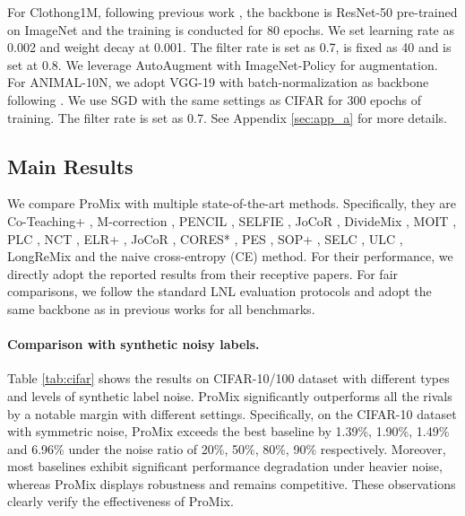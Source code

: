 \documentclass{article}
\begin{document}
For Clothong1M, following previous work \cite{DBLP:conf/iclr/LiSH20}, the backbone is ResNet-50 pre-trained on ImageNet and the training is conducted for 80 epochs. We set learning rate as 0.002 and weight decay at 0.001. The filter rate  is set as 0.7,  is fixed as 40 and  is set at 0.8. We leverage AutoAugment \cite{DBLP:conf/cvpr/CubukZMVL19} with ImageNet-Policy for augmentation. For ANIMAL-10N, we adopt VGG-19 \cite{DBLP:journals/corr/SimonyanZ14a} with batch-normalization as backbone following \cite{DBLP:conf/icml/SongK019}. We use SGD with the same settings as CIFAR for 300 epochs of training. The filter rate  is set as 0.7. {See Appendix \ref{sec:app_a} for more details.}







\subsection{Main Results}
We compare ProMix with multiple state-of-the-art methods. Specifically, they are Co-Teaching+ \cite{DBLP:conf/icml/Yu0YNTS19}, M-correction \cite{DBLP:conf/icml/ArazoOAOM19}, PENCIL \cite{DBLP:conf/cvpr/YiW19}, SELFIE \cite{DBLP:conf/icml/SongK019}, JoCoR \cite{DBLP:conf/cvpr/WeiFC020}, DivideMix \cite{DBLP:conf/iclr/LiSH20}, MOIT \cite{DBLP:conf/cvpr/OrtegoAAOM21}, PLC \cite{DBLP:conf/iclr/ZhangZW0021}, NCT \cite{DBLP:conf/cvpr/ChenSHS21}, ELR+ \cite{DBLP:conf/nips/LiuNRF20}, JoCoR \cite{DBLP:conf/cvpr/WeiFC020}, CORES* \cite{DBLP:conf/iclr/ChengZLGSL21}, PES \cite{DBLP:conf/nips/BaiYHYLMNL21}, SOP+ \cite{DBLP:journals/corr/abs-2202-14026}, SELC \cite{DBLP:conf/ijcai/LuH22}, ULC \cite{DBLP:conf/aaai/HuangBZBW22}, LongReMix \cite{DBLP:journals/pr/CordeiroSBRC23} and the naive cross-entropy (CE) method. For their performance, we directly adopt the reported results from their receptive papers. For fair comparisons, we follow the standard LNL evaluation protocols \cite{DBLP:conf/iclr/LiSH20,DBLP:conf/nips/XiaLW00NS19} and adopt the same backbone as in previous works for all benchmarks. 
\paragraph{Comparison with synthetic noisy labels. } 
 Table \ref{tab:cifar} shows the results on CIFAR-10/100 dataset with different types and levels of synthetic label noise. ProMix significantly outperforms all the rivals by a notable margin with different settings. Specifically, on the CIFAR-10 dataset with symmetric noise, ProMix exceeds the best baseline by 1.39\%, 1.90\%, 1.49\% and 6.96\% under the noise ratio of 20\%, 50\%, 80\%, 90\% respectively. Moreover, most baselines exhibit significant performance degradation under heavier noise, whereas ProMix displays robustness and remains competitive. These observations clearly verify the effectiveness of ProMix. 
\end{document}
